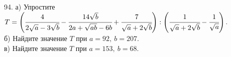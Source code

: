 94. а) Упростите $T=\left(\cfrac{4}{2\sqrt{a}-3\sqrt{b}}-\cfrac{14\sqrt{b}}{2a+\sqrt{ab}-6b}+\cfrac{7}{\sqrt{a}+2\sqrt{b}}\right):\left(\cfrac{1}{\sqrt{a}+2\sqrt{b}}-\cfrac{1}{\sqrt{a}}\right).$\\
б) Найдите значение $T$ при $a=92,\ b=207.$\\
в) Найдите значение $T$ при $a=153,\ b=68.$\\
